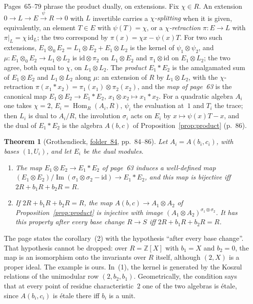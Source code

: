 \documentclass[11pt,a4paper]{amsart}
\newtheorem{theorem}{Theorem}[section]
\theoremstyle{definition}
\theoremstyle{remark}
\newcommand{\Z}{\mathbb Z}
\newcommand{\id}{\mathrm{id}}
\newcommand{\fac}[1]{\href{https://grothendieck.umontpellier.fr/#1.pdf}{folder~#1}}
\begin{document}
Pages~65--79 phrase the product dually, on extensions. Fix $\chi \in R$. An extension $0 \to L \to E \xrightarrow{\psi} R \to 0$ with $L$ invertible carries a \emph{$\chi$-splitting} when it is given, equivalently, an element $T \in E$ with $\psi(T) = \chi$, or a \emph{$\chi$-retraction} $\pi\colon E \to L$ with $\pi|_L = \chi\,\mathrm{id}_L$; the two correspond by $\pi(x) = \chi x - \psi(x)T$. For two such extensions, $E_1 \otimes_0 E_2 = L_1 \otimes E_2 + E_1 \otimes L_2$ is the kernel of $\psi_1 \otimes \psi_2$, and $\mu\colon E_1 \otimes_0 E_2 \to L_1 \otimes L_2$ is $\mathrm{id} \otimes \pi_2$ on $L_1 \otimes E_2$ and $\pi_1 \otimes \mathrm{id}$ on $E_1 \otimes L_2$; the two agree, both equal to $\chi$, on $L_1 \otimes L_2$. The \emph{product} $E_1 * E_2$ is the amalgamated sum of $E_1 \otimes E_2$ and $L_1 \otimes L_2$ along $\mu$: an extension of $R$ by $L_1 \otimes L_2$, with the $\chi$-retraction $\pi(x_1 * x_2) = \pi_1(x_1) \otimes \pi_2(x_2)$, and the \emph{map of page~63} is the canonical map $E_1 \otimes E_2 \to E_1 * E_2$, $x_1 \otimes x_2 \mapsto x_1 * x_2$. For a quadratic algebra $A_i$ one takes $\chi = 2$, $E_i = \operatorname{Hom}_R(A_i, R)$, $\psi_i$ the evaluation at~$1$ and $T_i$ the trace; then $L_i$ is dual to $A_i/R$, the involution $\sigma_i$ acts on $E_i$ by $x \mapsto \psi(x)T - x$, and the dual of $E_1 * E_2$ is the algebra $A(b, c)$ of Proposition~\ref{prop:product} (p.~86).

\begin{theorem}[Grothendieck, \fac{84}, pp.~84--86]\label{thm:coinv}
Let $A_i = A(b_i, c_i)$, with bases $(1, U_i)$, and let $E_i$ be the dual modules.
\begin{enumerate}
\item The map $E_1 \otimes E_2 \to E_1 * E_2$ of page~63 induces a well-defined map $(E_1 \otimes E_2)/\operatorname{Im}(\sigma_1\otimes\sigma_2 - \id) \to E_1 * E_2$, and this map is bijective iff $2R + b_1R + b_2R = R$.
\item If $2R + b_1R + b_2R = R$, the map $A(b, c) \to A_1 \otimes A_2$ of Proposition~\ref{prop:product} is injective with image $(A_1 \otimes A_2)^{\sigma_1\otimes\sigma_2}$. It has this property after every base change $R \to S$ iff $2R + b_1R + b_2R = R$.
\end{enumerate}
\end{theorem}

The page states the corollary~(2) with the hypothesis ``after every base change''. That hypothesis cannot be dropped: over $R = \Z[X]$ with $b_1 = X$ and $b_2 = 0$, the map is an isomorphism onto the invariants over $R$ itself, although $(2, X)$ is a proper ideal. The example is ours. In~(1), the kernel is generated by the Koszul relations of the unimodular row $(2, b_2, b_1)$. Geometrically, the condition says that at every point of residue characteristic~$2$ one of the two algebras is étale, since $A(b_i, c_i)$ is étale there iff $b_i$ is a unit.
\end{document}
